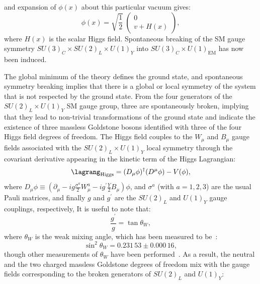 and expansion of $\phi(x)$ about this particular vacuum gives:
\begin{equation*}
    \phi(x) = 
    \sqrt{ \frac{1}{2} }
    \hspace{3pt}
    \begin{pmatrix}
        0
        \\
        v + H(x)
    \end{pmatrix},
\end{equation*}
where $H(x)$ is the scalar Higgs field.
Spontaneous breaking of the SM gauge symmetry $SU(3)_C \times SU(2)_L \times U(1)_Y$ into $SU(3)_C \times U(1)_\text{EM}$ has now been induced.

The global minimum of the theory defines the ground state, and spontaneous symmetry breaking implies that there is a global or local symmetry of the system that is not respected by the ground state.
From the four generators of the $SU(2)_L \times U(1)_Y$ SM gauge group, three are spontaneously broken, implying that they lead to non-trivial transformations of the ground state and indicate the existence of three massless Goldstone bosons identified with three of the four Higgs field degrees of freedom.
The Higgs field couples to the $W_\mu$ and $B_\mu$ gauge fields associated with the $SU(2)_L \times U(1)_Y$ local symmetry through the covariant derivative appearing in the kinetic term of the Higgs Lagrangian:
\begin{equation*}
    \lagrang_\text{Higgs} = (D_\mu\phi)^\dagger(D^\mu\phi) - V(\phi),
\end{equation*}
where $D_\mu\phi \equiv \left( \partial_\mu - ig \frac{\sigma^a}{2}W^a_\mu - ig^\prime \frac{Y}{2} B_\mu \right)\phi$,
and $\sigma^a$ (with $a = 1,2,3$) are the usual Pauli matrices,
and finally $g$ and $g^\prime$ are the $SU(2)_L$ and $U(1)_Y$ gauge couplings, respectively,
It is useful to note that:
\begin{equation*}
    \frac{g^\prime}{g} = \tan{\theta_W},
\end{equation*}
where $\theta_W$ is the weak mixing angle, which has been measured to be~\cite{noauthor_precision_2006}:
\begin{equation*}
    \sin^2{\theta_W} = 0.231\,53 \pm 0.000\,16,
\end{equation*}
though other measurements of $\theta_W$ have been performed~\cite{the_lhcb_collaboration_measurement_2015, cms_collaboration_measurement_2018}.
As a result, the neutral and the two charged massless Goldstone degrees of freedom mix with the gauge fields corresponding to the broken generators of $SU(2)_L$ and $U(1)_Y$:
